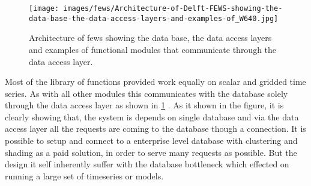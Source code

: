 \documentclass[a4paper,oneside,12pt]{report}
\begin{document}
\begin{figure}[htp]
    \centering
    \texttt{[image: images/fews/Architecture-of-Delft-FEWS-showing-the-data-base-the-data-access-layers-and-examples-of\_W640.jpg]}\\
    \caption{Architecture of \acrshort{fews} showing the data base, the data access layers and examples of functional modules that communicate through the data access layer. \cite{Werner2013TheSystem} }
    \label{fi:fews_data_layer}
\end{figure}
Most of the library of functions provided work equally on scalar and gridded time series. As with all other modules this communicates with the database solely through the data access layer as shown in \ref{fi:fews_data_layer} \cite{Werner2013TheSystem}. As it shown in the figure, it is clearly showing that, the system is depends on single database and via the data access layer all the requests are coming to the database though a connection. It is possible to setup and connect to a enterprise level database with clustering and shading as a paid solution, in order to serve many requests as possible. But the design it self inherently suffer with the database bottleneck which effected on running a large set of timeseries or models.
\end{document}
